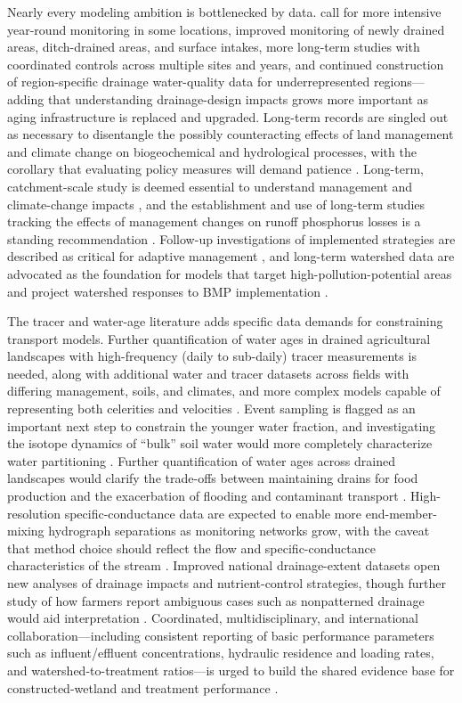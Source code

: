 Nearly every modeling ambition is bottlenecked by data. \textcite{Christianson2015} call for more intensive year-round monitoring in some locations, improved monitoring of newly drained areas, ditch-drained areas, and surface intakes, more long-term studies with coordinated controls across multiple sites and years, and continued construction of region-specific drainage water-quality data for underrepresented regions---adding that understanding drainage-design impacts grows more important as aging infrastructure is replaced and upgraded. Long-term records are singled out as necessary to disentangle the possibly counteracting effects of land management and climate change on biogeochemical and hydrological processes, with the corollary that evaluating policy measures will demand patience \parencite{Bauwe2020}. Long-term, catchment-scale study is deemed essential to understand management and climate-change impacts \parencite{Kelley2017}, and the establishment and use of long-term studies tracking the effects of management changes on runoff phosphorus losses is a standing recommendation \parencite{Gillingham2000}. Follow-up investigations of implemented strategies are described as critical for adaptive management \parencite{Schilling2012b}, and long-term watershed data are advocated as the foundation for models that target high-pollution-potential areas and project watershed responses to BMP implementation \parencite{Lemke2011}.

The tracer and water-age literature adds specific data demands for constraining transport models. Further quantification of water ages in drained agricultural landscapes with high-frequency (daily to sub-daily) tracer measurements is needed, along with additional water and tracer datasets across fields with differing management, soils, and climates, and more complex models capable of representing both celerities and velocities \parencite{Williams2021}. Event sampling is flagged as an important next step to constrain the younger water fraction, and investigating the isotope dynamics of ``bulk'' soil water would more completely characterize water partitioning \parencite{DimitrovaPetrova2020}. Further quantification of water ages across drained landscapes would clarify the trade-offs between maintaining drains for food production and the exacerbation of flooding and contaminant transport \parencite{DimitrovaPetrova2020}. High-resolution specific-conductance data are expected to enable more end-member-mixing hydrograph separations as monitoring networks grow, with the caveat that method choice should reflect the flow and specific-conductance characteristics of the stream \parencite{Kronholm2015}. Improved national drainage-extent datasets open new analyses of drainage impacts and nutrient-control strategies, though further study of how farmers report ambiguous cases such as nonpatterned drainage would aid interpretation \parencite{Jame2022}. Coordinated, multidisciplinary, and international collaboration---including consistent reporting of basic performance parameters such as influent/effluent concentrations, hydraulic residence and loading rates, and watershed-to-treatment ratios---is urged to build the shared evidence base for constructed-wetland and treatment performance \parencite{Messer2021,Sims1998}.

